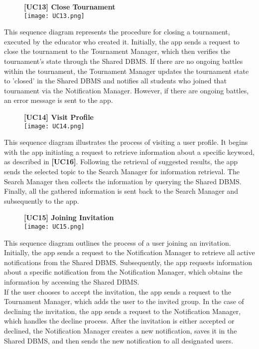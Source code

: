 \documentclass{article}
\begin{document}
\begin{figure}[H]
    \centering
    \textbf{[UC13] Close Tournament} \\
    \texttt{[image: UC13.png]}
\end{figure}
\noindent
This sequence diagram represents the procedure for closing a tournament, executed by the educator who created it. Initially, the app sends a request to close the tournament to the Tournament Manager, which then verifies the tournament's state through the Shared DBMS. If there are no ongoing battles within the tournament, the Tournament Manager updates the tournament state to 'closed' in the Shared DBMS and notifies all students who joined that tournament via the Notification Manager. However, if there are ongoing battles, an error message is sent to the app.

\begin{figure}[H]
    \centering
    \textbf{[UC14] Visit Profile} \\
    \texttt{[image: UC14.png]}
\end{figure}
\noindent
This sequence diagram illustrates the process of visiting a user profile. It begins with the app initiating a request to retrieve information about a specific keyword, as described in \textbf{[UC16]}. Following the retrieval of suggested results, the app sends the selected topic to the Search Manager for information retrieval. The Search Manager then collects the information by querying the Shared DBMS. Finally, all the gathered information is sent back to the Search Manager and subsequently to the app.

\begin{figure}[H]
    \centering
    \textbf{[UC15] Joining Invitation} \\
    \texttt{[image: UC15.png]}
\end{figure}
\noindent
This sequence diagram outlines the process of a user joining an invitation. Initially, the app sends a request to the Notification Manager to retrieve all active notifications from the Shared DBMS. Subsequently, the app requests information about a specific notification from the Notification Manager, which obtains the information by accessing the Shared DBMS. \\
If the user chooses to accept the invitation, the app sends a request to the Tournament Manager, which adds the user to the invited group. In the case of declining the invitation, the app sends a request to the Notification Manager, which handles the decline process. After the invitation is either accepted or declined, the Notification Manager creates a new notification, saves it in the Shared DBMS, and then sends the new notification to all designated users.
\end{document}
